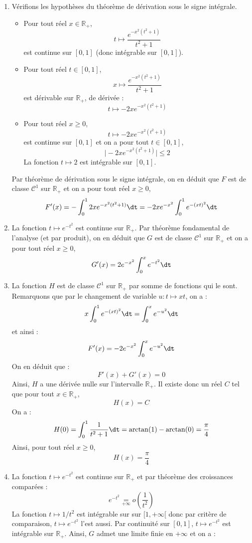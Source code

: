 \documentclass[a4paper,10pt]{report}
\begin{document}
\corr 

\begin{enumerate}
\item Vérifions les hypothèses du théorème de dérivation sous le signe intégrale.
\begin{itemize}
\item Pour tout réel $x \in \mathbb{R}_+$, 
$$ t \mapsto \frac{e^{-x^2(t^2+1)}}{t^2+1}$$
est continue sur $[0,1]$ (donc intégrable sur $[0,1]$).
\item Pour tout réel $t \in [0,1]$,
$$ x \mapsto \frac{e^{-x^2(t^2+1)}}{t^2+1}$$
est dérivable sur $\mathbb{R}_+$, de dérivée :
$$ t \mapsto - 2xe^{-x^2(t^2+1)}$$
\item Pour tout réel $x \geq 0$,
$$ t \mapsto - 2xe^{-x^2(t^2+1)} $$
est continue sur $[0,1]$ et on a pour tout $t \in [0,1]$,
$$ \vert  - 2xe^{-x^2(t^2+1)} \vert \leq 2$$
La fonction $t \mapsto 2$ est intégrable sur $[0,1]$.
\end{itemize}
Par théorème de dérivation sous le signe intégrale, on en déduit que $F$ est de classe $\mathcal{C}^1$ sur $\mathbb{R}_+$ et on a pour tout réel $x \geq 0$,
$$ F'(x) = - \int_0^1 2x e^{-x^2(t^2+1)} \dt = - 2xe^{-x^2} \int_0^1  e^{-(xt)^2} \dt$$
\item La fonction $t \mapsto e^{-t^2}$ est continue sur $\mathbb{R}_+$. Par théorème fondamental de l'analyse (et par produit), on en déduit que $G$ est de classe $\mathcal{C}^1$ sur $\mathbb{R}_+$ et on a pour tout réel $x \geq 0$,
$$ G'(x) = 2 e^{-x^2} \int_0^x e^{-t^2} \dt$$
\item La fonction $H$ est de classe $\mathcal{C}^1$ sur $\mathbb{R}_+$ par somme de fonctions qui le sont. Remarquons que par le changement de variable $  u : t \mapsto xt$, on a :
$$ x\int_0^1  e^{-(xt)^2} \dt = \int_0^x  e^{-u^2} \dt$$ 
et ainsi :
$$ F'(x) = -2e^{-x^2} \int_0^x  e^{-u^2} \dt$$ 
On en déduit que :
$$ F'(x)+G'(x) = 0$$
Ainsi, $H$ a une dérivée nulle sur l'intervalle $\mathbb{R}_+$. Il existe donc un réel $C$ tel que pour tout $x \in \mathbb{R}_+$,
$$ H(x) = C$$
On a :
$$ H(0) = \int_{0}^1 \frac{1}{t^2+1} \dt = \arctan(1) - \arctan(0) = \dfrac{\pi}{4}$$
Ainsi, pour tout réel $x \geq 0$,
$$ H(x) = \dfrac{\pi}{4}$$
\item La fonction $t \mapsto e^{-t^2}$ est continue sur $\mathbb{R}_+$ et par théorème des croissances comparées :
$$ e^{-t^2} \underset{+ \infty}{=} o \left( \dfrac{1}{t^2} \right)$$
La fonction $t \mapsto 1/t^2$ est intégrable sur sur $[1, + \infty[$ donc par critère de comparaison, $t \mapsto e^{-t^2}$ l'est aussi. Par continuité sur $[0,1]$, $t \mapsto e^{-t^2}$ est intégrable sur $\mathbb{R}_+$. Ainsi, $G$ admet une limite finie en $+ \infty$ et on a :

\end{enumerate}
\end{document}

